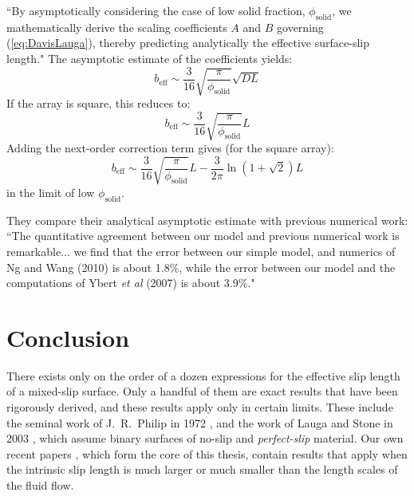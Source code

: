\documentclass[12pt, a4paper, twoside, openright]{book}
\newcommand{\beff}{\ensuremath{b_{\mathrm{eff}}}}
\newcommand{\phisol}{\ensuremath{\phi_{\mathrm{solid}}}}
\begin{document}
``By asymptotically considering the case of low solid fraction, $\phisol$, we mathematically derive the scaling coefficients $A$ and $B$ governing (\ref{eq:DavisLauga}),  thereby predicting analytically the effective surface-slip length."
The asymptotic estimate of the coefficients yields:
\begin{equation}
\beff \sim \frac{3}{16} \sqrt{ \frac{\pi}{\phisol}} \sqrt{DL}
\end{equation}
If the array is square, this reduces to:
\begin{equation}
\beff \sim \frac{3}{16} \sqrt{ \frac{\pi}{\phisol}} L
\end{equation}
Adding the next-order correction term gives (for the square array):
\begin{equation}
\beff \sim \frac{3}{16} \sqrt{ \frac{\pi}{\phisol}} L - \frac{3}{2\pi} \ln(1 + \sqrt{2})L
\end{equation}
in the limit of low $\phisol$.

They compare their analytical asymptotic estimate with previous numerical work: ``The quantitative agreement between our model and previous numerical work is remarkable... we find that the error between our simple model, and numerics of Ng and Wang (2010) \cite{NgWang2010} is about 1.8\%, while the error between our model and the computations of Ybert \emph{et al} (2007) \cite{Ybert2007} is about 3.9\%."



\section{Conclusion}

There exists only on the order of a dozen expressions for the effective slip length of a mixed-slip surface.  Only a handful of them are exact results that have been rigorously derived, 
and these results apply only in certain limits.  These include
 the seminal work of J.\ R.\ Philip in 1972 \cite{Philip1972}, and the work of Lauga and Stone in 2003 \cite{LaugaStone2003}, which assume binary surfaces of no-slip and \emph{perfect-slip} material.
Our own recent papers \cite{HendyLund2007,LundHendy2008,Lund2012}, which form the core of this thesis, contain results that apply when the intrinsic slip length is much larger or much smaller than the length scales of the fluid flow.
\end{document}

